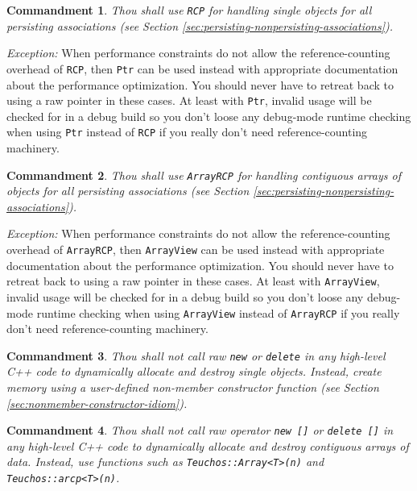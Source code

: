 \documentclass[pdf,ps2pdf,11pt]{SANDreport}
\newtheorem{commandment}{Commandment}
\begin{document}
\begin{commandment}
Thou shall use {}\texttt{RCP} for handling single objects for all
persisting associations (see Section
{}\ref{sec:persisting-nonpersisting-associations}).
\end{commandment}

{}\textit{Exception:} When performance constraints do not allow the
reference-counting overhead of {}\texttt{RCP}, then {}\texttt{Ptr} can
be used instead with appropriate documentation about the performance
optimization.  You should never have to retreat back to using a raw
pointer in these cases.  At least with {}\texttt{Ptr}, invalid usage
will be checked for in a debug build so you don't loose any debug-mode
runtime checking when using {}\texttt{Ptr} instead of {}\texttt{RCP}
if you really don't need reference-counting machinery.

\begin{commandment}
Thou shall use {}\texttt{ArrayRCP} for handling contiguous arrays of
objects for all persisting associations (see Section
{}\ref{sec:persisting-nonpersisting-associations}).
\end{commandment}

{}\textit{Exception:} When performance constraints do not allow the
reference-counting overhead of {}\texttt{ArrayRCP}, then
{}\texttt{ArrayView} can be used instead with appropriate
documentation about the performance optimization.  You should never
have to retreat back to using a raw pointer in these cases.  At least
with {}\texttt{ArrayView}, invalid usage will be checked for in a
debug build so you don't loose any debug-mode runtime checking when
using {}\texttt{ArrayView} instead of {}\texttt{ArrayRCP} if you
really don't need reference-counting machinery.

\begin{commandment}
Thou shall not call raw {}\texttt{new} or {}\texttt{delete} in any
high-level C++ code to dynamically allocate and destroy single
objects.  Instead, create memory using a user-defined non-member
constructor function (see Section
{}\ref{sec:nonmember-constructor-idiom}).
\end{commandment}

\begin{commandment}
Thou shall not call raw operator {}\texttt{new []} or {}\texttt{delete
[]} in any high-level C++ code to dynamically allocate and destroy
contiguous arrays of data.  Instead, use functions such as
{}\texttt{Teuchos::Array<T>(n)} and {}\texttt{Teuchos::arcp<T>(n)}.
\end{commandment}
\end{document}

